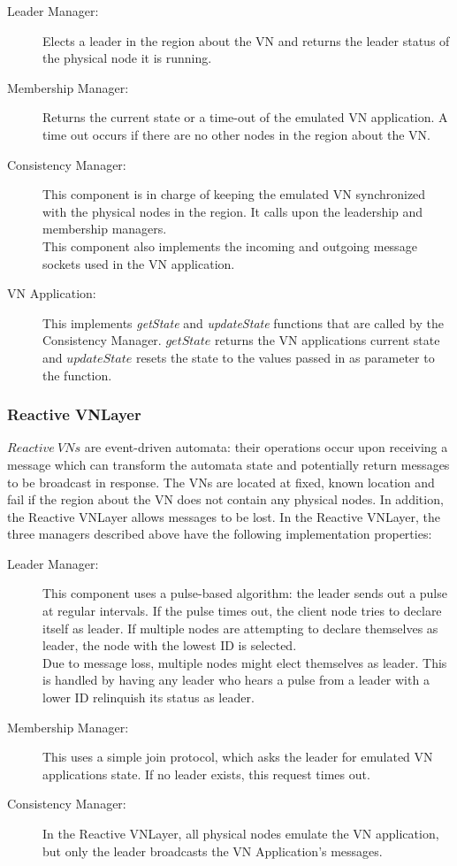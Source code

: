 \documentclass[12pt]{article}
\begin{document}
\begin{description}
\item[Leader Manager:] Elects a leader in the region about the VN and returns  the leader status of the physical node it is running.
\item[Membership Manager:] Returns the current state or a time-out of the emulated VN application.  A time out occurs if there are no other nodes in the region about the VN.
\item[Consistency Manager:] This component is in charge of keeping the emulated VN synchronized with the physical nodes in the region. It calls upon the leadership and membership managers.\\
This component also implements the incoming and outgoing message sockets used in the VN application. 

\item[VN Application:] This implements {\em getState} and {\em updateState} functions that are called by the Consistency Manager.  $getState$ returns the VN applications current state and $updateState$ resets the state to the values passed in as parameter to the function.  
\end{description}

\subsubsection{Reactive VNLayer}
$Reactive\ VNs$ are event-driven automata: their operations occur upon receiving a message which can transform the automata state and potentially return messages to be broadcast in response.  The VNs are located at fixed, known location and fail if the region about the VN does not contain any physical nodes.  In addition, the Reactive VNLayer allows messages to be lost.  
In the Reactive VNLayer, the three managers described above have the following implementation properties: 
\begin{description}
\item[Leader Manager:] This component uses a pulse-based algorithm: the leader sends out a pulse at regular intervals.  If the pulse times out, the client node tries to declare itself as leader.  If multiple nodes are attempting to declare themselves as leader, the node with the lowest ID is selected.  \\
Due to message loss, multiple nodes might elect themselves as leader. This is handled by having any leader who hears a pulse from a  leader with a lower ID relinquish its status as leader.  
\item[Membership Manager:] This uses a simple join protocol, which asks the leader for emulated VN applications state.  If no leader exists, this request times out. 
\item[Consistency Manager:]In the Reactive VNLayer, all physical nodes emulate the VN application, but only the leader broadcasts the VN Application's messages.  
\end{description}
\end{document}
